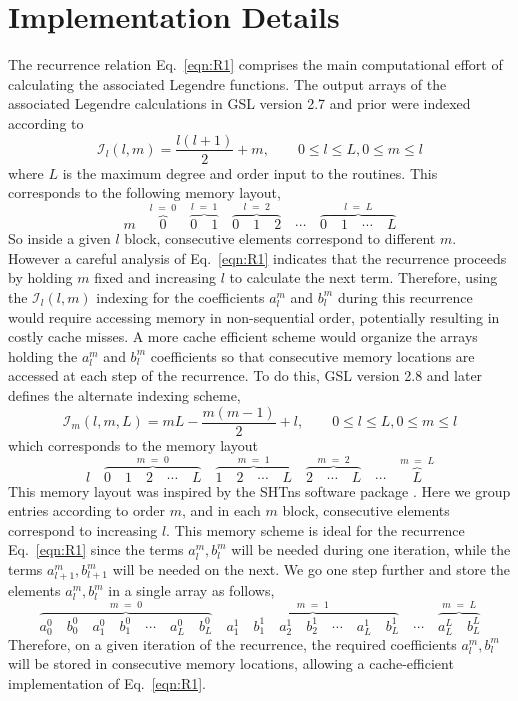 \documentclass[12pt]{article}
\begin{document}
\section{Implementation Details}

The recurrence relation Eq.~\eqref{eqn:R1} comprises the main computational effort of calculating
the associated Legendre functions.  The output arrays of the associated Legendre calculations in GSL
version 2.7 and prior were indexed according to
\begin{equation}
\mathcal{I}_l(l,m) = \frac{l(l+1)}{2} + m, \qquad 0 \leq l \leq L, 0 \leq m \leq l
\end{equation}
where $L$ is the maximum degree and order input to the routines. This corresponds to
the following memory layout,
$$
m \quad \overbrace{0}^{l \; = \; 0} \quad \overbrace{0 \quad 1}^{l \; = \; 1} \quad \overbrace{0 \quad 1 \quad 2}^{l \; = \; 2} \quad \cdots \quad \overbrace{0 \quad 1 \quad \cdots \quad L}^{l \; = \; L}
$$
So inside a given $l$ block, consecutive elements correspond to different $m$. However a careful analysis
of Eq.~\eqref{eqn:R1} indicates that the recurrence proceeds by holding $m$ fixed and increasing $l$ to
calculate the next term. Therefore, using the $\mathcal{I}_l(l,m)$ indexing for the coefficients $a_l^m$
and $b_l^m$ during this recurrence would require accessing memory in non-sequential order, potentially resulting
in costly cache misses. A more cache efficient scheme would organize the arrays holding the $a_l^m$ and $b_l^m$
coefficients so that consecutive memory locations are accessed at each step of the recurrence. To do this,
GSL version 2.8 and later defines the alternate indexing scheme,
\begin{equation}
\mathcal{I}_m(l,m,L) = m L - \frac{m(m-1)}{2} + l, \qquad 0 \leq l \leq L, 0 \leq m \leq l
\end{equation}
which corresponds to the memory layout
$$
l \quad \overbrace{0 \quad 1 \quad 2 \quad \cdots \quad L}^{m \; = \; 0} \quad \overbrace{1 \quad 2 \quad \cdots \quad L}^{m \; = \; 1} \quad \overbrace{2 \quad \cdots \quad L}^{m \; = \; 2} \quad \cdots \quad \overbrace{L}^{m \; = \; L}
$$
This memory layout was inspired by the SHTns software package
\citep{schaeffer2013}.
Here we group entries according to order $m$, and in each $m$ block, consecutive elements correspond to increasing $l$.
This memory scheme is ideal for the recurrence Eq.~\eqref{eqn:R1} since the terms $a_l^m,b_l^m$ will be needed
during one iteration, while the terms $a_{l+1}^m,b_{l+1}^m$ will be needed on the next. We go one step further and
store the elements $a_l^m,b_l^m$ in a single array as follows,
$$
\overbrace{a_0^0 \quad b_0^0 \quad a_1^0 \quad b_1^0 \quad \cdots \quad a_L^0 \quad b_L^0}^{m \; = \; 0} \quad \overbrace{a_1^1 \quad b_1^1 \quad a_2^1 \quad b_2^1 \quad \cdots \quad a_L^1 \quad b_L^1}^{m \; = \; 1} \quad \cdots \quad \overbrace{a_L^L \quad b_L^L}^{m \; = \; L}
$$
Therefore, on a given iteration of the recurrence, the required coefficients $a_l^m,b_l^m$ will be stored in
consecutive memory locations, allowing a cache-efficient implementation of Eq.~\eqref{eqn:R1}.
\end{document}
